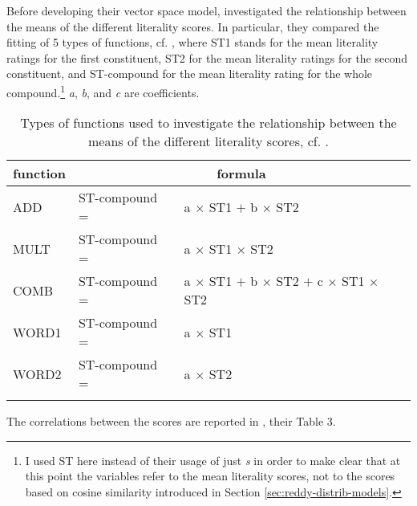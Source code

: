 Before developing their vector space model, \citeauthor{Reddyetal:2011} investigated
the relationship between the means of the different literality scores. In
particular, they compared the fitting of 5 types of functions,
cf. , where ST1 stands for the mean literality ratings for the
first constituent, ST2 for the mean literality ratings for the second
constituent, and ST-compound for the mean literality rating for the
whole compound.\footnote{I used ST here instead of their usage of just \emph{s} in order to make clear that at this point the variables refer to the mean literality scores, not to the scores based on cosine similarity introduced in Section \ref{sec:reddy-distrib-models}.}
 \emph{a}, \emph{b}, and \emph{c} are coefficients.

\begin{table}[!htb]
  \begin{center}
\begin{tabular}[h]{lll}\lsptoprule
function&\multicolumn{2}{c}{formula}\\\midrule
ADD&ST-compound =&a $\times$ ST1 $+$ b  $\times$ ST2   \\
MULT&ST-compound =&a $\times$ ST1 $\times$ ST2\\
COMB&ST-compound =& a $\times$ ST1 $+$ b $\times$ ST2 $+$ c $\times$ ST1 $\times$ ST2\\
WORD1&ST-compound =& a $\times$ ST1\\
WORD2&ST-compound =& a $\times$ ST2\\\lspbottomrule
\end{tabular}
\end{center}
\caption[Functions for literality scores]{Types of functions used to investigate the relationship between the means of the different literality scores, cf. \citet[213]{Reddyetal:2011}.}
\label{tab:reddy-types-of-functions}
\end{table}

The correlations between the scores are reported in , their Table 3.

